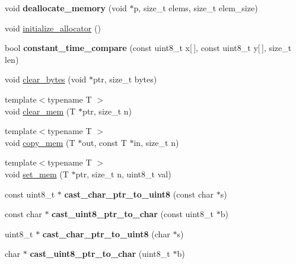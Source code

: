 \begin{DoxyCompactItemize}
void {\bfseries deallocate\+\_\+memory} (void $\ast$p, size\+\_\+t elems, size\+\_\+t elem\+\_\+size)
\item 
void \mbox{\hyperlink{namespace_botan_a5c191055a4f5a2dba6bfde0e8056eaab}{initialize\+\_\+allocator}} ()
\item 
\mbox{\label{namespace_botan_a8715d6667de5be024045dd6f4f53094e}} 
bool {\bfseries constant\+\_\+time\+\_\+compare} (const uint8\+\_\+t x\mbox{[}$\,$\mbox{]}, const uint8\+\_\+t y\mbox{[}$\,$\mbox{]}, size\+\_\+t len)
\item 
void \mbox{\hyperlink{namespace_botan_a7ce0c066e1e47c17c9ed2d4c5ae35b34}{clear\+\_\+bytes}} (void $\ast$ptr, size\+\_\+t bytes)
\item 
{\footnotesize template$<$typename T $>$ }\\void \mbox{\hyperlink{namespace_botan_aeb6cf2051aa89f9d76cf4d55c126b314}{clear\+\_\+mem}} (T $\ast$ptr, size\+\_\+t n)
\item 
{\footnotesize template$<$typename T $>$ }\\void \mbox{\hyperlink{namespace_botan_a81dcdaaa3ce9b5c1025d32be2594b2de}{copy\+\_\+mem}} (T $\ast$out, const T $\ast$in, size\+\_\+t n)
\item 
{\footnotesize template$<$typename T $>$ }\\void \mbox{\hyperlink{namespace_botan_ace49e77ed072090e3a7df831742981a6}{set\+\_\+mem}} (T $\ast$ptr, size\+\_\+t n, uint8\+\_\+t val)
\item 
\mbox{\label{namespace_botan_a1deb698938556129dbf3e1d6ca7d1fb2}} 
const uint8\+\_\+t $\ast$ {\bfseries cast\+\_\+char\+\_\+ptr\+\_\+to\+\_\+uint8} (const char $\ast$s)
\item 
\mbox{\label{namespace_botan_a0494ff2de8a6d21cc45d6460c3ba6242}} 
const char $\ast$ {\bfseries cast\+\_\+uint8\+\_\+ptr\+\_\+to\+\_\+char} (const uint8\+\_\+t $\ast$b)
\item 
\mbox{\label{namespace_botan_ae81ace2e0e08f4fe29255708450c82de}} 
uint8\+\_\+t $\ast$ {\bfseries cast\+\_\+char\+\_\+ptr\+\_\+to\+\_\+uint8} (char $\ast$s)
\item 
\mbox{\label{namespace_botan_a1db9e3bf2de4699653f4308ec0ad6f11}} 
char $\ast$ {\bfseries cast\+\_\+uint8\+\_\+ptr\+\_\+to\+\_\+char} (uint8\+\_\+t $\ast$b)

\end{DoxyCompactItemize}
